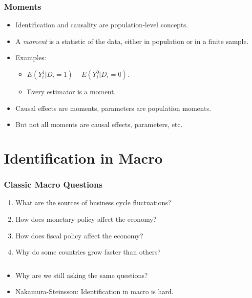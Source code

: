 \documentclass[english,xcolor=svgnames]{beamer}
\begin{document}
\begin{frame}
\frametitle[alignment=center]{Moments}
\begin{itemize}
	\item Identification and causality are population-level concepts.
	\item A \emph{moment} is a statistic of the data, either in population or in a finite sample. 
	\item Examples:
	\begin{itemize}
		\item $E(Y_i^1 | D_i=1 ) - E(Y_i^0 | D_i=0 )$.
		\item Every estimator is a moment.
	\end{itemize}
	\item Causal effects are moments, parameters are population moments.
	\item But not all moments are causal effects, parameters, etc.
\end{itemize}
\end{frame}



\section{Identification in Macro}


\begin{frame}
\frametitle[alignment=center]{Classic Macro Questions}
\begin{enumerate}
	\item What are the sources of business cycle fluctuations? 
	\item How does monetary policy affect the economy? 
	\item How does fiscal policy affect the economy? 
	\item Why do some countries grow faster than others? 
\end{enumerate}
$\;$
\begin{itemize}
	\item Why are we still asking the same questions? 
	\item Nakamura-Steinsson: Identification in macro is hard.
\end{itemize}
\end{frame}
\end{document}
